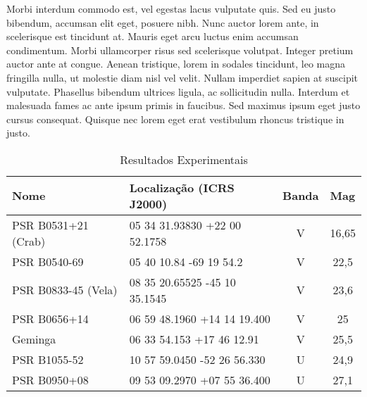 Morbi interdum commodo est, vel egestas lacus vulputate quis. Sed eu justo bibendum, accumsan elit eget, posuere nibh. Nunc auctor lorem ante, in scelerisque est tincidunt at. Mauris eget arcu luctus enim accumsan condimentum. Morbi ullamcorper risus sed scelerisque volutpat. Integer pretium auctor ante at congue. Aenean tristique, lorem in sodales tincidunt, leo magna fringilla nulla, ut molestie diam nisl vel velit. Nullam imperdiet sapien at suscipit vulputate. Phasellus bibendum ultrices ligula, ac sollicitudin nulla. Interdum et malesuada fames ac ante ipsum primis in faucibus. Sed maximus ipsum eget justo cursus consequat. Quisque nec lorem eget erat vestibulum rhoncus tristique in justo.


\begin{table}[!htb]
\centering
\begin{tabular}{|l|l|c|c|}
\hline
\textbf{Nome}       & \textbf{Localização (ICRS J2000)} & \multicolumn{1}{l|}{\textbf{Banda}} & \multicolumn{1}{l|}{\textbf{Mag}} \\ \hline
PSR B0531+21 (Crab) & 05 34 31.93830 +22 00 52.1758     & V                                   & 16,65                             \\ \hline
PSR B0540-69        & 05 40 10.84 -69 19 54.2           & V                                   & 22,5                              \\ \hline
PSR B0833-45 (Vela) & 08 35 20.65525 -45 10 35.1545     & V                                   & 23,6                              \\ \hline
PSR B0656+14        & 06 59 48.1960 +14 14 19.400       & V                                   & 25                                \\ \hline
Geminga             & 06 33 54.153 +17 46 12.91         & V                                   & 25,5                              \\ \hline
PSR B1055-52        & 10 57 59.0450 -52 26 56.330       & U                                   & 24,9                              \\ \hline
PSR B0950+08        & 09 53 09.2970 +07 55 36.400       & U                                   & 27,1                              \\ \hline
\end{tabular}
\caption{Resultados Experimentais}
\label{resultados}
\end{table}